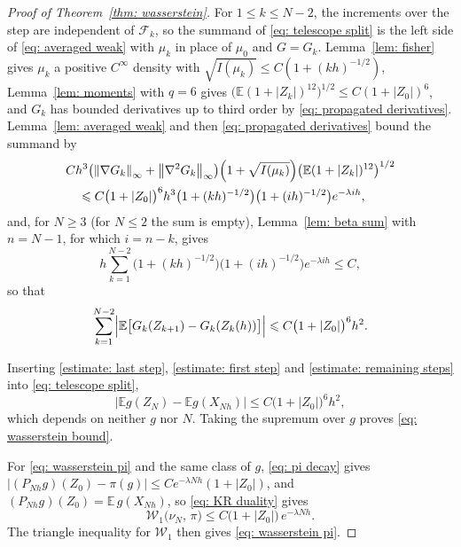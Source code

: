 \documentclass[namedate,webpdf,imanum]{ima-authoring-template}
\newcommand{\Le}{\leqslant}
\newcommand{\Ge}{\geqslant}
\theoremstyle{thmstyletwo}
\numberwithin{equation}{section}
\begin{document}
\begin{proof}[Proof of Theorem~\ref{thm: wasserstein}]
    For $1 \Le k \Le N-2$, the increments over the step are independent of $\mathcal F_k$, so the summand of \eqref{eq: telescope split} is the left side of \eqref{eq: averaged weak} with $\mu_k$ in place of $\mu_0$ and $G = G_k$. Lemma~\ref{lem: fisher} gives $\mu_k$ a positive $C^\infty$ density with $\sqrt{I(\mu_k)} \Le C ( 1 + (kh)^{-1/2} )$, Lemma~\ref{lem: moments} with $q = 6$ gives $\bigl( \mathbb E ( 1 + |Z_k| )^{12} \bigr)^{1/2} \Le C (1 + |Z_0|)^{6}$, and $G_k$ has bounded derivatives up to third order by \eqref{eq: propagated derivatives}. Lemma~\ref{lem: averaged weak} and then \eqref{eq: propagated derivatives} bound the summand by
    \begin{align*}
        & C h^3 \bigl( \norm{\nabla G_k}_\infty + \norm{\nabla^2 G_k}_\infty \bigr) \Bigl( 1 + \sqrt{I(\mu_k)} \Bigr) \bigl( \mathbb E ( 1 + |Z_k| )^{12} \bigr)^{1/2} \\
        & \quad \Le C \bigl( 1 + |Z_0| \bigr)^{6} h^3 \bigl( 1 + (kh)^{-1/2} \bigr) \bigl( 1 + (ih)^{-1/2} \bigr) e^{-\lambda i h} ,
    \end{align*}
    and, for $N \Ge 3$ (for $N \Le 2$ the sum is empty), Lemma~\ref{lem: beta sum} with $n = N - 1$, for which $i = n - k$, gives
    \begin{equation*}
        h \sum_{k=1}^{N-2} \bigl( 1 + (kh)^{-1/2} \bigr) \bigl( 1 + (ih)^{-1/2} \bigr) e^{-\lambda i h} \Le C ,
    \end{equation*}
    so that
    \begin{equation}
        \sum_{k=1}^{N-2} \Bigl| \mathbb E \bigl[ G_k(Z_{k+1}) - G_k(Z_k(h)) \bigr] \Bigr|
        \Le C \bigl( 1 + |Z_0| \bigr)^{6} h^2 .
        \label{estimate: remaining steps}
    \end{equation}

    Inserting \eqref{estimate: last step}, \eqref{estimate: first step} and \eqref{estimate: remaining steps} into \eqref{eq: telescope split},
    \begin{equation*}
        \bigl| \mathbb E g(Z_N) - \mathbb E g(X_{Nh}) \bigr|
        \Le C \bigl( 1 + |Z_0| \bigr)^{6} h^2 ,
    \end{equation*}
    which depends on neither $g$ nor $N$. Taking the supremum over $g$ proves \eqref{eq: wasserstein bound}.

    For \eqref{eq: wasserstein pi} and the same class of $g$, \eqref{eq: pi decay} gives $|(P_{Nh}g)(Z_0) - \pi(g)| \Le C e^{-\lambda Nh}(1 + |Z_0|)$, and $(P_{Nh} g)(Z_0) = \mathbb E\, g(X_{Nh})$, so \eqref{eq: KR duality} gives
    \begin{equation*}
        \mathcal W_1\bigl( \nu_N ,\, \pi \bigr) \Le C \bigl( 1 + |Z_0| \bigr)\, e^{-\lambda N h} .
    \end{equation*}
    The triangle inequality for $\mathcal W_1$ then gives \eqref{eq: wasserstein pi}.
\end{proof}
\end{document}
